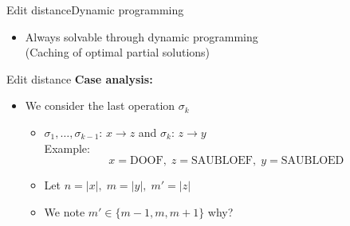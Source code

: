 \begin{frame}{Edit distance}{Dynamic programming}
\begin{itemize}
\begin{itemize}
\begin{figure}[!h]
          \end{figure}
      \end{itemize}
    \item<11->
      Always solvable through dynamic programming\\
      (Caching of optimal partial solutions)
  \end{itemize}
\end{frame}


\begin{frame}{Edit distance}
  \textbf{Case analysis:}
  \begin{itemize}
    \item<2->
      We consider the last operation $\sigma_k$
      \begin{itemize}
        \item<3->
          $\sigma_1, \dots, \sigma_{k-1}$:
          {\color{MainA}$x \rightarrow z$} and $\sigma_k$:
          {\color{MainA}$z \rightarrow y$}\\
          Example:
          \begin{displaymath}
            x = \mathrm{DOOF}, \;
            z = \mathrm{SAUBLOEF}, \;
            y = \mathrm{SAUBLOED}
          \end{displaymath}
        \item<4->
          Let $n = \vert x \vert, \; m = \vert y \vert, \; m' = \vert z \vert$
        \item<5->
          We note $m' \in \{m - 1, m, m + 1\}$
          \hspace{1.5em}
          {\color{gray}why?}
      \end{itemize}
  \end{itemize}
\end{frame}

